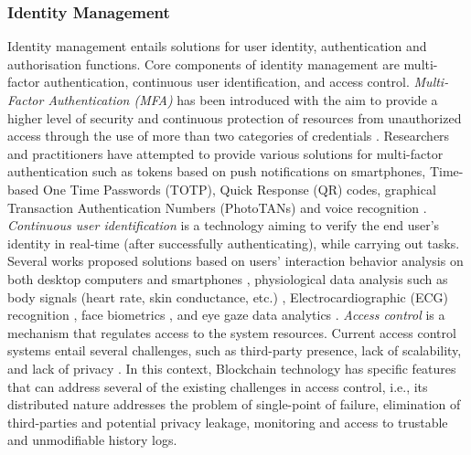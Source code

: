 \documentclass[a4paper,11pt]{article}
\begin{document}
\subsubsection{Identity Management}
\label{sect:auth}
Identity management entails solutions for user identity, authentication and authorisation functions. Core components of identity management are multi-factor authentication, continuous user identification, and access control. \textit{Multi-Factor Authentication (MFA)} has been introduced with the aim to provide a higher level of security and continuous protection of resources from unauthorized access through the use of more than two categories of credentials \cite{scheidt2005multiple, bhargav2007privacy}. Researchers and practitioners have attempted to provide various solutions for multi-factor authentication such as tokens based on push notifications on smartphones, Time-based One Time Passwords (TOTP), Quick Response (QR) codes, graphical Transaction Authentication Numbers (PhotoTANs) and voice recognition \cite{mare2016study, ometov2018multi, 10.1145/1053291.1053327}. \textit{Continuous user identification} is a technology aiming to verify the end user's identity in real-time (after successfully authenticating), while carrying out tasks. Several works proposed solutions based on users’ interaction behavior analysis on both desktop computers and smartphones \cite{10.1145/2991079.2991097, 10.1145/2702123.2702252, gascon2014continuous}, physiological data analysis such as body signals (heart rate, skin conductance, etc.) \cite{ometov2018multi, rui2018survey}, Electrocardiographic (ECG) recognition \cite{silva2011clinical}, face biometrics \cite{bhattacharyya2009biometric, dabbah2007secure}, and eye gaze data analytics \cite{jain2004introduction, bulling2012increasing}. \textit{Access control} is a mechanism that regulates access to the system resources. Current access control systems entail several challenges, such as third-party presence, lack of scalability, and lack of privacy \cite{10.1145/3350546.3352561, 10.1145/3316481}. In this context, Blockchain technology has specific features that can address several of the existing challenges in access control, i.e., its distributed nature addresses the problem of single-point of failure, elimination of third-parties and potential privacy leakage, monitoring and access to trustable and unmodifiable history logs.
%
\end{document}
